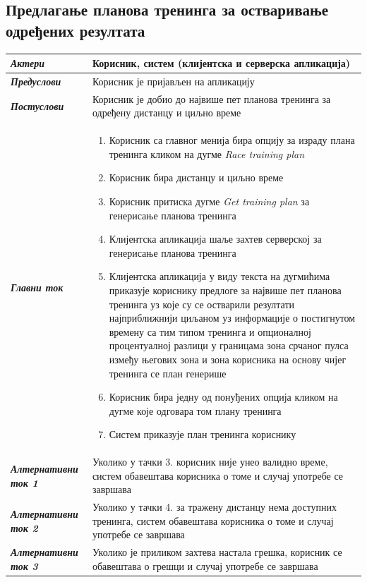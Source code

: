 \documentclass[12pt,oneside]{memoir}
\begin{document}
\subsection*{Предлагање планова тренинга за остваривање одређених резултата}
\begin{longtable}{p{0.23\linewidth} p{0.77\linewidth}}
 \hline
 \textit{\textbf{Актери}} & Корисник, систем (клијентска и серверска апликација) \\
\hline

\textit{\textbf{Предуслови}} & Корисник је пријављен на апликацију \\
 \hline

\textit{\textbf{Постуслови}} & Корисник је добио до највише пет планова тренинга за одређену дистанцу и циљно време \\
 \hline
 \textit{\textbf{Главни ток}} &  
    \begin{enumerate}
        \item Корисник са главног менија бира опцију за израду плана тренинга кликом на дугме \textit{Race training plan}
        \item Корисник бира дистанцу и циљно време
        \item Корисник притиска дугме \textit{Get training plan} за генерисање планова тренинга
        \item Клијентска апликација шаље захтев серверској за генерисање планова тренинга
        \item Клијентска апликација у виду текста на дугмићима приказује кориснику предлоге за највише пет планова тренинга уз које су се остварили резултати најприближнији циљаном уз информације о постигнутом времену са тим типом тренинга и опционалној процентуалној разлици у границама зона срчаног пулса између његових зона и зона корисника на основу чијег тренинга се план генерише
        \item Корисник бира једну од понуђених опција кликом на дугме које одговара том плану тренинга        
        \item Систем приказује план тренинга кориснику
    \end{enumerate}\\
 \hline
\textit{\textbf{Алтернативни ток 1}} & Уколико у тачки 3. корисник није унео валидно време, систем обавештава корисника о томе и случај употребе се завршава \\
 \hline
\textit{\textbf{Алтернативни ток 2}} & Уколико у тачки 4. за тражену дистанцу нема доступних тренинга, систем обавештава корисника о томе и случај употребе се завршава \\
 \hline
\textit{\textbf{Алтернативни ток 3}} & Уколико је приликом захтева настала грешка, корисник се обавештава о грешци и случај употребе се завршава \\
 \hline 
 
\end{longtable}
\end{document}
